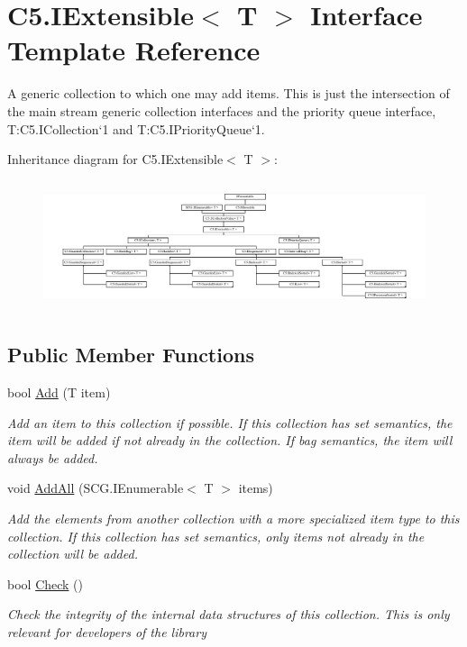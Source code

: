 \hypertarget{interface_c5_1_1_i_extensible}{}\section{C5.\+I\+Extensible$<$ T $>$ Interface Template Reference}
\label{interface_c5_1_1_i_extensible}


A generic collection to which one may add items. This is just the intersection of the main stream generic collection interfaces and the priority queue interface, T\+:\+C5.\+I\+Collection`1 and T\+:\+C5.\+I\+Priority\+Queue`1.  


Inheritance diagram for C5.\+I\+Extensible$<$ T $>$\+:\begin{figure}[H]
\begin{center}
\leavevmode
\includegraphics[height=3.825137cm]{interface_c5_1_1_i_extensible}
\end{center}
\end{figure}
\subsection*{Public Member Functions}
\begin{DoxyCompactItemize}
\item 
bool \hyperlink{interface_c5_1_1_i_extensible_acfe8d39605927db1aff0572e2b5c1089}{Add} (T item)
\begin{DoxyCompactList}\small\item\em Add an item to this collection if possible. If this collection has set semantics, the item will be added if not already in the collection. If bag semantics, the item will always be added. \end{DoxyCompactList}\item 
void \hyperlink{interface_c5_1_1_i_extensible_a1fb4d50c5b340e60303da72e9d0ede6e}{Add\+All} (S\+C\+G.\+I\+Enumerable$<$ T $>$ items)
\begin{DoxyCompactList}\small\item\em Add the elements from another collection with a more specialized item type to this collection. If this collection has set semantics, only items not already in the collection will be added. \end{DoxyCompactList}\item 
bool \hyperlink{interface_c5_1_1_i_extensible_aeeb6b87af61e455df42d68834d711bcb}{Check} ()
\begin{DoxyCompactList}\small\item\em Check the integrity of the internal data structures of this collection. {\itshape This is only relevant for developers of the library} \end{DoxyCompactList}\end{DoxyCompactItemize}
